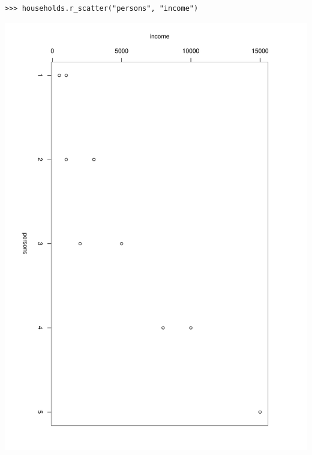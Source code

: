 \begin{verbatim}
>>> households.r_scatter("persons", "income")
\end{verbatim}
\begin{center}
\includegraphics[scale=0.3, angle=90]{images/incomerscatter.pdf}

\end{center}
